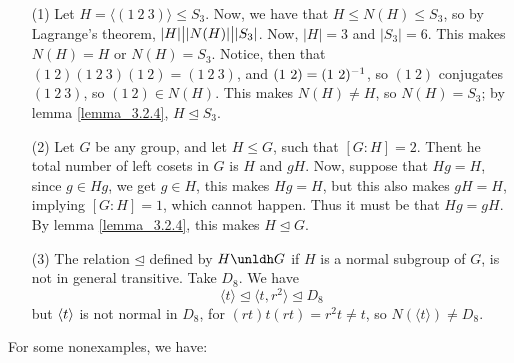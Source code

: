 \begin{example}\label{example_3.5}
  \begin{enumerate}
    \item[(1)] Let $H=\langle (1 \ 2 \ 3) \rangle \leq S_3$. Now, we have that
      $H \leq N(H) \leq S_3$, so by Lagrange's theorem, $|H| \big{|}
      |N(H)| \big{|} |S_3|$. Now, $|H|=3$ and $|S_3|=6$.
      This makes $N(H)=H$ or $N(H)=S_3$. Notice, then that $(1 \ 2)(1 \ 2
      \ 3)(1 \ 2)=(1 \ 2 \ 3)$, and $(1 \ 2)=(1 \ 2)^{-1}$, so $(1 \ 2)$
      conjugates $(1 \ 2 \ 3)$, so $(1 \ 2) \in N(H)$. This makes $N(H)
      \neq H$, so $N(H)=S_3$; by lemma \ref{lemma_3.2.4}, $H \unlhd S_3$.

    \item[(2)] Let $G$ be any group, and let  $H \leq G$, such that
      $[G:H]=2$. Thent he total number of left cosets in $G$ is  $H$ and
      $gH$. Now, suppose that  $Hg=H$, since $g \in Hg$, we get $g \in H$,
      this makes  $Hg=H$, but this also makes $gH=H$, implying  $[G:H]=1$,
      which cannot happen. Thus it must be that $Hg=gH$. By lemma
      \ref{lemma_3.2.4}, this makes $H \unlhd G$.

    \item[(3)] The relation $\unlhd$ defined by $H \unldh G$ if  $H$ is a
      normal subgroup of  $G$, is not in general transitive. Take $D_8$.
      We have
      \begin{equation*}
        \langle t \rangle \unlhd \langle t,r^2 \rangle \unlhd D_8
      \end{equation*}
      but $\langle t\rangle$ is not normal in $ D_8$, for $(rt)t(rt)=r^2t \neq
      t$, so $N(\langle t \rangle) \neq D_8$.
  \end{enumerate}
\end{example}

For some nonexamples, we have:

